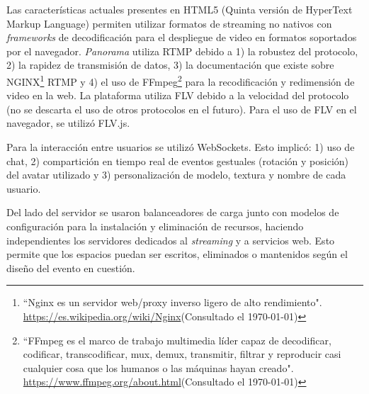 Las características actuales presentes en HTML5 (Quinta versión de HyperText Markup Language) permiten utilizar formatos de streaming no nativos con \textit{frameworks} de decodificación para el despliegue de video en formatos soportados por el navegador. \textit{Panorama} utiliza RTMP debido a 1) la robustez del protocolo, 2) la rapidez de transmisión de datos, 3) la documentación que existe sobre NGINX\footnote{``Nginx es un servidor web/proxy inverso ligero de alto rendimiento". \url{https://es.wikipedia.org/wiki/Nginx}(Consultado el \today)} RTMP y 4) el uso de FFmpeg\footnote{``FFmpeg es el marco de trabajo multimedia líder capaz de decodificar, codificar, transcodificar, mux, demux, transmitir, filtrar y reproducir casi cualquier cosa que los humanos o las máquinas hayan creado". \url{https://www.ffmpeg.org/about.html}(Consultado el \today)} para la recodificación y redimensión de video en la web. La plataforma utiliza FLV debido a la velocidad del protocolo (no se descarta el uso de otros protocolos en el futuro). Para el uso de FLV en el navegador, se utilizó FLV.js. 

Para la interacción entre usuarios se utilizó WebSockets. Esto implicó: 1) uso de chat, 2) compartición en tiempo real de eventos gestuales (rotación y posición) del avatar utilizado y 3) personalización de modelo, textura y nombre de cada usuario. 

Del lado del servidor  se usaron balanceadores de carga junto con modelos de configuración para la instalación y eliminación de recursos, haciendo independientes los servidores dedicados al \textit{streaming} y a servicios web. Esto permite que los espacios puedan ser escritos, eliminados o mantenidos según el diseño del evento en cuestión.


